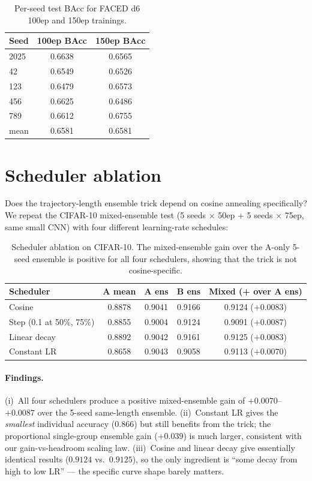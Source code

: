 \begin{table}[h]
\centering
\caption{Per-seed test BAcc for FACED d6 100ep and 150ep trainings.}
\label{tab:perseed_faced}
\begin{tabular}{lcc}
\toprule
Seed & 100ep BAcc & 150ep BAcc \\
\midrule
2025 & 0.6638 & 0.6565 \\
42   & 0.6549 & 0.6526 \\
123  & 0.6479 & 0.6573 \\
456  & 0.6625 & 0.6486 \\
789  & 0.6612 & 0.6755 \\
\midrule
mean & 0.6581 & 0.6581 \\
\bottomrule
\end{tabular}
\end{table}

\section{Scheduler ablation}
\label{sup:scheduler}

Does the trajectory-length ensemble trick depend on cosine annealing
specifically? We repeat the CIFAR-10 mixed-ensemble test (5 seeds
$\times$ 50ep + 5 seeds $\times$ 75ep, same small CNN) with four
different learning-rate schedules:

\begin{table}[h]
\centering
\caption{Scheduler ablation on CIFAR-10. The mixed-ensemble gain over
the A-only 5-seed ensemble is positive for all four schedulers, showing
that the trick is not cosine-specific.}
\label{tab:sup_scheduler}
\begin{tabular}{lcccc}
\toprule
Scheduler & A mean & A ens & B ens & Mixed (+ over A ens) \\
\midrule
Cosine         & 0.8878 & 0.9041 & 0.9166 & 0.9124 ($+0.0083$) \\
Step (0.1 at 50\%, 75\%)  & 0.8855 & 0.9004 & 0.9124 & 0.9091 ($+0.0087$) \\
Linear decay   & 0.8892 & 0.9042 & 0.9161 & 0.9125 ($+0.0083$) \\
Constant LR    & 0.8658 & 0.9043 & 0.9058 & 0.9113 ($+0.0070$) \\
\bottomrule
\end{tabular}
\end{table}

\paragraph{Findings.}
(i)~All four schedulers produce a positive mixed-ensemble gain of
$+0.0070$--$+0.0087$ over the 5-seed same-length ensemble.
(ii)~Constant LR gives the \emph{smallest} individual accuracy (0.866)
but still benefits from the trick; the proportional single-group
ensemble gain ($+0.039$) is much larger, consistent with our
gain-vs-headroom scaling law. (iii)~Cosine and linear decay give
essentially identical results ($0.9124$ vs.\ $0.9125$), so the only
ingredient is ``some decay from high to low LR'' --- the specific curve
shape barely matters.

